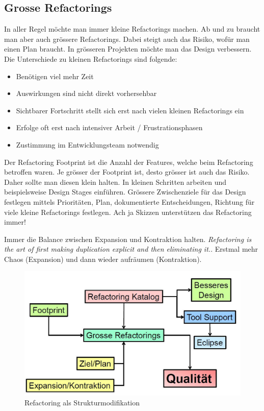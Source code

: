 \subsection{Grosse Refactorings}
In aller Regel möchte man immer kleine Refactorings machen. Ab und zu braucht man aber auch grössere Refactorings. Dabei steigt auch das Risiko, wofür man einen Plan braucht. In grösseren Projekten möchte man das Design verbessern. Die Unterschiede zu kleinen Refactorings sind folgende:

\begin{itemize}
	\item Benötigen viel mehr Zeit
	\item Auswirkungen sind nicht direkt vorhersehbar
	\item Sichtbarer Fortschritt stellt sich erst nach vielen kleinen Refactorings ein
	\item Erfolge oft erst nach intensiver Arbeit / Frustrationsphasen
	\item Zustimmung im Entwicklungsteam notwendig
\end{itemize}

Der Refactoring Footprint ist die Anzahl der Features, welche beim Refactoring betroffen waren. Je grösser der Footprint ist, desto grösser ist auch das Risiko. Daher sollte man diesen klein halten. In kleinen Schritten arbeiten und beispielsweise Design Stages einführen. Grössere Zwischenziele für das Design festlegen mittels Prioritäten, Plan, dokumentierte Entscheidungen, Richtung für viele kleine Refactorings festlegen. Ach ja Skizzen unterstützen das Refactoring immer! 

Immer die Balance zwischen Expansion und Kontraktion halten. \textit{Refactoring is the art of first making duplication explicit and then eliminating it.}. Erstmal mehr Chaos (Expansion) und dann wieder aufräumen (Kontraktion).

\begin{figure}[h!]
	\centering
	\includegraphics[width=0.57\linewidth]{fig/refactoring-als-strukturmodifikation}
	\caption{Refactoring als Strukturmodifikation}
	\label{fig:refactoring-als-strukturmodifikation}
\end{figure}


